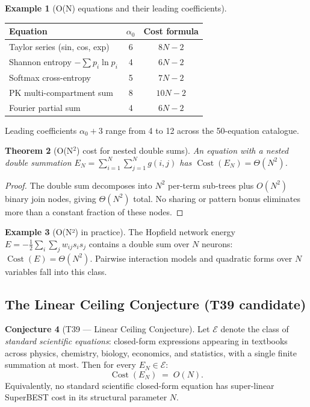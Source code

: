 \documentclass[12pt,a4paper]{article}
\newtheorem{theorem}{Theorem}[section]
\theoremstyle{definition}
\newtheorem{conjecture}[theorem]{Conjecture}
\newtheorem{example}[theorem]{Example}
\newcommand{\Cost}{\operatorname{Cost}}
\begin{document}
\begin{example}[O(N) equations and their leading coefficients]
\label{ex:ON}
\begin{center}
\begin{tabular}{@{}lcc@{}}
\toprule
\textbf{Equation} & $\alpha_0$ & \textbf{Cost formula} \\
\midrule
Taylor series (sin, cos, exp)   & 6  & $8N - 2$ \\
Shannon entropy $-\sum p_i \ln p_i$ & 4  & $6N - 2$ \\
Softmax cross-entropy           & 5  & $7N - 2$ \\
PK multi-compartment sum        & 8  & $10N - 2$ \\
Fourier partial sum             & 4  & $6N - 2$ \\
\bottomrule
\end{tabular}
\end{center}
Leading coefficients $\alpha_0 + 3$ range from 4 to 12 across the 50-equation
catalogue.
\end{example}

\begin{theorem}[O(N\texorpdfstring{$^2$}{²}) cost for nested double sums]
\label{thm:ON2}
An equation with a nested double summation
$E_{N} = \sum_{i=1}^{N}\sum_{j=1}^{N} g(i,j)$
has $\Cost(E_N) = \Theta(N^2)$.
\end{theorem}

\begin{proof}
The double sum decomposes into $N^2$ per-term sub-trees plus $O(N^2)$ binary
join nodes, giving $\Theta(N^2)$ total.  No sharing or pattern bonus
eliminates more than a constant fraction of these nodes.
\end{proof}

\begin{example}[O(N²) in practice]
The Hopfield network energy $E = -\frac{1}{2}\sum_{i}\sum_{j} w_{ij} s_i s_j$
contains a double sum over $N$ neurons: $\Cost(E) = \Theta(N^2)$.  Pairwise
interaction models and quadratic forms over $N$ variables fall into this class.
\end{example}

\subsection{The Linear Ceiling Conjecture (T39 candidate)}

\begin{conjecture}[T39 --- Linear Ceiling Conjecture]
\label{conj:T39}
Let $\mathcal{E}$ denote the class of \emph{standard scientific equations}:
closed-form expressions appearing in textbooks across physics, chemistry,
biology, economics, and statistics, with a single finite summation at most.
Then for every $E_N \in \mathcal{E}$:
\[
  \Cost(E_N) \;=\; O(N).
\]
Equivalently, no standard scientific closed-form equation has super-linear
SuperBEST cost in its structural parameter $N$.
\end{conjecture}
\end{document}
